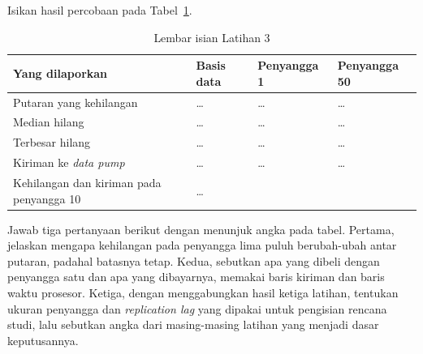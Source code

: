 Isikan hasil percobaan pada Tabel~\ref{tab:lat3ruang-hasil}.

\begin{table}[htbp]
  \centering
  \caption{Lembar isian Latihan 3}
  \label{tab:lat3ruang-hasil}
  \begin{tabularx}{\textwidth}{|X|l|l|l|}
    \hline
    \textbf{Yang dilaporkan} & \textbf{Basis data} & \textbf{Penyangga 1} & \textbf{Penyangga 50} \\
    \hline
    Putaran yang kehilangan & \dots & \dots & \dots \\
    \hline
    Median hilang & \dots & \dots & \dots \\
    \hline
    Terbesar hilang & \dots & \dots & \dots \\
    \hline
    Kiriman ke \textit{data pump} & \dots & \dots & \dots \\
    \hline
    Kehilangan dan kiriman pada penyangga 10 & \multicolumn{3}{l|}{\dots} \\
    \hline
  \end{tabularx}
\end{table}

Jawab tiga pertanyaan berikut dengan menunjuk angka pada tabel. Pertama,
jelaskan mengapa kehilangan pada penyangga lima puluh berubah-ubah antar
putaran, padahal batasnya tetap. Kedua, sebutkan apa yang dibeli dengan
penyangga satu dan apa yang dibayarnya, memakai baris kiriman dan baris waktu
prosesor. Ketiga, dengan menggabungkan hasil ketiga latihan, tentukan ukuran
penyangga dan \textit{replication lag} yang dipakai untuk pengisian rencana
studi, lalu sebutkan angka dari masing-masing latihan yang menjadi dasar
keputusannya.
